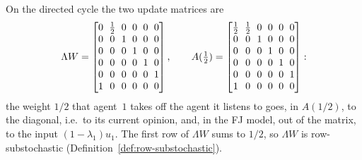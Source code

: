 On the directed cycle the two update matrices are
\[
  {\setlength{\arraycolsep}{3pt}
  \Lambda W = \begin{bmatrix}
     0&\frac12&0&0&0&0\\ 0&0&1&0&0&0\\ 0&0&0&1&0&0\\ 0&0&0&0&1&0\\ 0&0&0&0&0&1\\ 1&0&0&0&0&0
  \end{bmatrix},
  \qquad
  A(\tfrac12) = \begin{bmatrix}
     \frac12&\frac12&0&0&0&0\\ 0&0&1&0&0&0\\ 0&0&0&1&0&0\\ 0&0&0&0&1&0\\ 0&0&0&0&0&1\\ 1&0&0&0&0&0
  \end{bmatrix}}:
\]
the weight $1/2$ that agent~$1$ takes off the agent it listens to goes, in $A(1/2)$, to
the diagonal, i.e.\ to its current opinion, and, in the FJ model, out of the matrix,
to the input $(1-\lambda_1)u_1$. The first row of $\Lambda W$ sums to $1/2$, so
$\Lambda W$ is row-substochastic (Definition~\ref{def:row-substochastic}).


